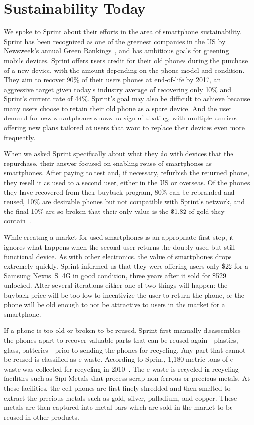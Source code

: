 \section{Sustainability Today}
\label{sec-sustainability}

We spoke to Sprint about their efforts in the area of smartphone
sustainability. Sprint has been recognized as one of the greenest companies
in the US by Newsweek's annual Green Rankings~\cite{sprintgreen-url}, and has
ambitious goals for greening mobile devices. Sprint offers users credit for
their old phones during the purchase of a new device, with the amount
depending on the phone model and condition. They aim to recover 90\% of their
users phones at end-of-life by 2017, an aggressive target given today's
industry average of recovering only 10\% and Sprint's current rate of 44\%.
Sprint's goal may also be difficult to achieve because many users choose to
retain their old phone as a spare device. And the user demand for new
smartphones shows no sign of abating, with multiple carriers offering new
plans tailored at users that want to replace their devices even more
frequently.

When we asked Sprint specifically about what they do with devices that the
repurchase, their answer focused on enabling reuse of smartphones as
smartphones. After paying to test and, if necessary, refurbish the returned
phone, they resell it as used to a second user, either in the US or overseas.
Of the phones they have recovered from their buyback program, 80\% can be
rebranded and reused, 10\% are desirable phones but not compatible with
Sprint's network, and the final 10\% are so broken that their only value is
the \$1.82 of gold they contain~\cite{cnn-goldinphone}.

While creating a market for used smartphones is an appropriate first step, it
ignores what happens when the second user returns the doubly-used but still
functional device. As with other electronics, the value of smartphones drops
extremely quickly. Sprint informed us that they were offering users only \$22
for a Samsung Nexus~S~4G in good condition, three years after it sold for
\$529 unlocked. After several iterations either one of two things will
happen: the buyback price will be too low to incentivize the user to return
the phone, or the phone will be old enough to not be attractive to users in
the market for a smartphone.

If a phone is too old or broken to be reused, Sprint first manually
disassembles the phones apart to recover valuable parts that can be reused
again---plastics, glass, batteries---prior to sending the phones for
recycling. Any part that cannot be reused is classified as e-waste. According
to Sprint, 1,180 metric tons of e-waste was collected for recycling in
2010~\cite{sprintpolicy-url}. The e-waste is recycled in recycling facilities
such as Sipi Metals that process scrap non-ferrous or precious metals. At
these facilities, the cell phones are first finely shredded and then smelted
to extract the precious metals such as gold, silver, palladium, and copper.
These metals are then captured into metal bars which are sold in the market
to be reused in other products.

